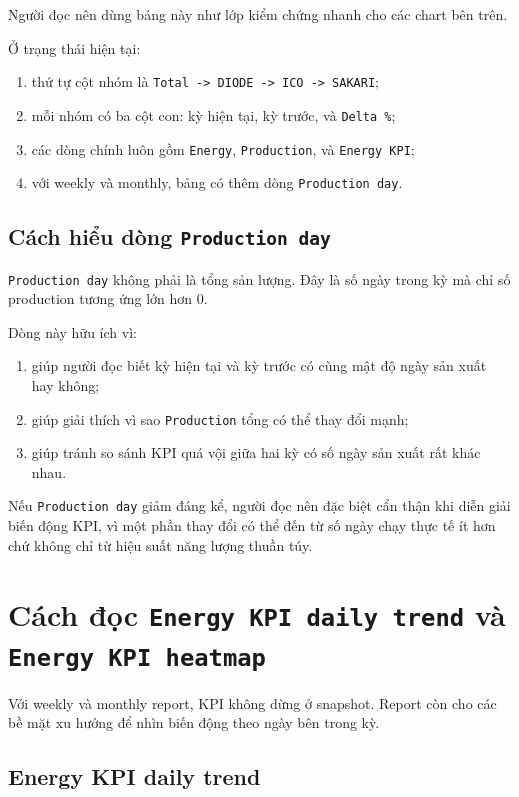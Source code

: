 Người đọc nên dùng bảng này như lớp kiểm chứng nhanh cho các chart bên trên.

Ở trạng thái hiện tại:

\begin{enumerate}[label=-]
\item thứ tự cột nhóm là \texttt{Total -> DIODE -> ICO -> SAKARI};
\item mỗi nhóm có ba cột con: kỳ hiện tại, kỳ trước, và \texttt{Delta \%};
\item các dòng chính luôn gồm \texttt{Energy}, \texttt{Production}, và \texttt{Energy KPI};
\item với weekly và monthly, bảng có thêm dòng \texttt{Production day}.
\end{enumerate}

\subsection{Cách hiểu dòng \texttt{Production day}}

\texttt{Production day} không phải là tổng sản lượng. Đây là số ngày trong kỳ mà chỉ số production tương ứng lớn hơn 0.

Dòng này hữu ích vì:

\begin{enumerate}[label=-]
\item giúp người đọc biết kỳ hiện tại và kỳ trước có cùng mật độ ngày sản xuất hay không;
\item giúp giải thích vì sao \texttt{Production} tổng có thể thay đổi mạnh;
\item giúp tránh so sánh KPI quá vội giữa hai kỳ có số ngày sản xuất rất khác nhau.
\end{enumerate}

Nếu \texttt{Production day} giảm đáng kể, người đọc nên đặc biệt cẩn thận khi diễn giải biến động KPI, vì một phần thay đổi có thể đến từ số ngày chạy thực tế ít hơn chứ không chỉ từ hiệu suất năng lượng thuần túy.

\section{Cách đọc \texttt{Energy KPI daily trend} và \texttt{Energy KPI heatmap}}

Với weekly và monthly report, KPI không dừng ở snapshot. Report còn cho các bề mặt xu hướng để nhìn biến động theo ngày bên trong kỳ.

\subsection{Energy KPI daily trend}

